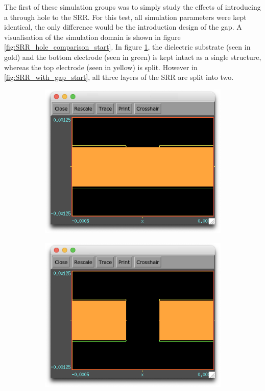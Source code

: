The first of these simulation groups was to simply study the effects of introducing a through hole to the SRR. For this test, all simulation parameters were kept identical, the only difference would be the introduction design of the gap. A visualisation of the simulation domain is shown in figure \ref{fig:SRR_hole_comparison_start}. In figure \ref{fig:SRR_no_gap_start}, the dielectric substrate (seen in gold) and the bottom electrode (seen in green) is kept intact as a single structure, whereas the top electrode (seen in yellow) is split. However in \ref{fig:SRR_with_gap_start}, all three layers of the SRR are split into two.

\begin{figure}[h!]
    \centering
    \begin{subfigure}{0.5\textwidth}
        \centering
        \includegraphics[width=0.9\linewidth]{chapter_4/figures/SRR_no_gap_start.png}
        \caption{}
        \label{fig:SRR_no_gap_start}
    \end{subfigure}%
    \begin{subfigure}{.5\textwidth}
        \centering
        \includegraphics[width=0.9\linewidth]{chapter_4/figures/SRR_with_gap_start.png}

\end{subfigure}
\end{figure}
